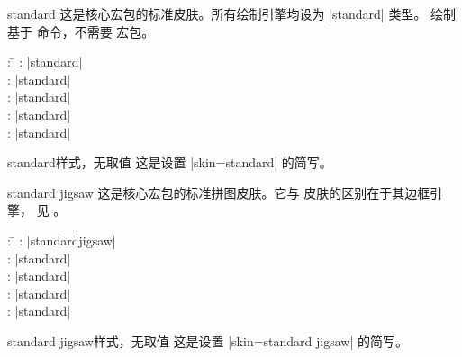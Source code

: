 \begin{docSkin}{standard}
  这是核心宏包的标准皮肤。所有绘制引擎均设为 |standard| 类型。
  绘制基于  命令，不需要  宏包。
\begin{tcolorbox}[skintable=standard]
  \begin{tabbing}
    : \=\kill
    :           \> |standard|\\
    : \> |standard|\\ 
    :        \> |standard|\\
    :    \> |standard|\\
    :           \> |standard|
  \end{tabbing}
\end{tcolorbox}
\end{docSkin}

\begin{docTcbKey}{standard}{}{样式，无取值}
  这是设置 |skin=standard| 的简写。
\end{docTcbKey}

\begin{dispExample}
\end{dispExample}

\clearpage

\begin{docSkin}{standard jigsaw}
  这是核心宏包的标准拼图皮肤。它与  皮肤的区别在于其边框引擎，
  见 。
\begin{tcolorbox}[skintable=standard jigsaw]
  \begin{tabbing}
    : \=\kill
    :           \> |standardjigsaw|\\
    : \> |standard|\\ 
    :        \> |standard|\\
    :    \> |standard|\\
    :           \> |standard|
  \end{tabbing}
\end{tcolorbox}
\end{docSkin}

\begin{docTcbKey}{standard jigsaw}{}{样式，无取值}
  这是设置 |skin=standard jigsaw| 的简写。
\end{docTcbKey}

